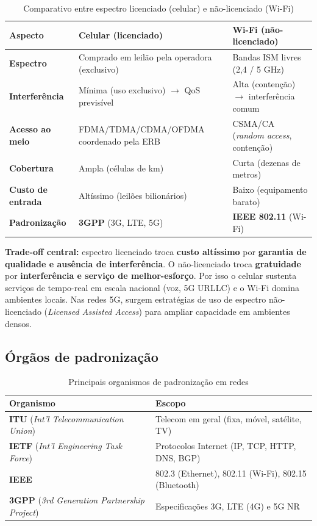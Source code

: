 \documentclass[11pt,a4paper]{article}
\begin{document}
\begin{table}[h!]
\centering
\caption{Comparativo entre espectro licenciado (celular) e não-licenciado (Wi-Fi)}
\label{tab:lic_vs_nonlic}
\begin{tabularx}{\textwidth}{lXX}
\toprule
\textbf{Aspecto} & \textbf{Celular (licenciado)} & \textbf{Wi-Fi (não-licenciado)} \\
\midrule
\textbf{Espectro} & Comprado em leilão pela operadora (exclusivo) & Bandas ISM livres (2,4 / 5 GHz) \\
\textbf{Interferência} & Mínima (uso exclusivo) $\to$ QoS previsível & Alta (contenção) $\to$ interferência comum \\
\textbf{Acesso ao meio} & FDMA/TDMA/CDMA/OFDMA coordenado pela ERB & CSMA/CA (\textit{random access}, contenção) \\
\textbf{Cobertura} & Ampla (células de km) & Curta (dezenas de metros) \\
\textbf{Custo de entrada} & Altíssimo (leilões bilionários) & Baixo (equipamento barato) \\
\textbf{Padronização} & \textbf{3GPP} (3G, LTE, 5G) & \textbf{IEEE 802.11} (Wi-Fi) \\
\bottomrule
\end{tabularx}
\end{table}

\begin{reflexao}
\textbf{Trade-off central:} espectro licenciado troca \textbf{custo altíssimo} por \textbf{garantia de qualidade e ausência de interferência}. O não-licenciado troca \textbf{gratuidade} por \textbf{interferência e serviço de melhor-esforço}. Por isso o celular sustenta serviços de tempo-real em escala nacional (voz, 5G URLLC) e o Wi-Fi domina ambientes locais. Nas redes 5G, surgem estratégias de uso de espectro não-licenciado (\textit{Licensed Assisted Access}) para ampliar capacidade em ambientes densos.
\end{reflexao}

\subsection{Órgãos de padronização}

\begin{table}[h!]
\centering
\caption{Principais organismos de padronização em redes}
\label{tab:padroes}
\begin{tabular}{ll}
\toprule
\textbf{Organismo} & \textbf{Escopo} \\
\midrule
\textbf{ITU} (\textit{Int'l Telecommunication Union}) & Telecom em geral (fixa, móvel, satélite, TV) \\
\textbf{IETF} (\textit{Int'l Engineering Task Force}) & Protocolos Internet (IP, TCP, HTTP, DNS, BGP) \\
\textbf{IEEE} & 802.3 (Ethernet), 802.11 (Wi-Fi), 802.15 (Bluetooth) \\
\textbf{3GPP} (\textit{3rd Generation Partnership Project}) & Especificações 3G, LTE (4G) e 5G NR \\
\bottomrule
\end{tabular}
\end{table}
\end{document}
